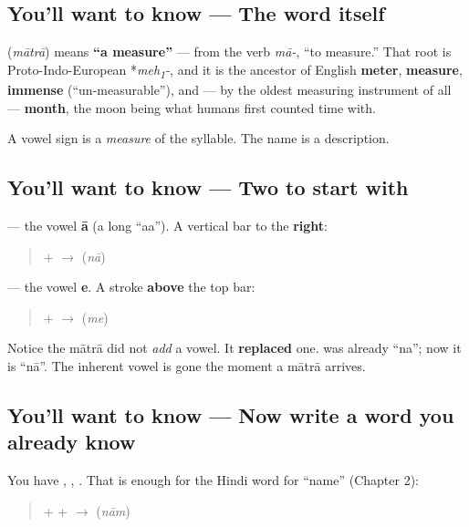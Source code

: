 \subsection*{You'll want to know — The word itself}
\textbf{} (\emph{mātrā}) means \textbf{\textquotedblleft{}a measure\textquotedblright{}} — from the verb \emph{mā-}, \textquotedblleft{}to measure.\textquotedblright{} That root is Proto-Indo-European *\emph{meh\textsubscript{1}-}, and it is the ancestor of English \textbf{meter}, \textbf{measure}, \textbf{immense} (\textquotedblleft{}un-measurable\textquotedblright{}), and — by the oldest measuring instrument of all — \textbf{month}, the moon being what humans first counted time with.

A vowel sign is a \emph{measure} of the syllable. The name is a description.

\subsection*{You'll want to know — Two to start with}
\textbf{} — the vowel \textbf{ā} (a long \textquotedblleft{}aa\textquotedblright{}). A vertical bar to the \textbf{right}:

\begin{quote}
 +  $\to$ \textbf{} (\emph{nā})
\end{quote}

\textbf{} — the vowel \textbf{e}. A stroke \textbf{above} the top bar:

\begin{quote}
 +  $\to$ \textbf{} (\emph{me})
\end{quote}

Notice the mātrā did not \emph{add} a vowel. It \textbf{replaced} one.  was already \textquotedblleft{}na\textquotedblright{}; now it is \textquotedblleft{}nā\textquotedblright{}. The inherent vowel is gone the moment a mātrā arrives.

\subsection*{You'll want to know — Now write a word you already know}
You have , , . That is enough for the Hindi word for \textquotedblleft{}name\textquotedblright{} (Chapter 2):

\begin{quote}
 +  +  $\to$ \textbf{} (\emph{nām})
\end{quote}

